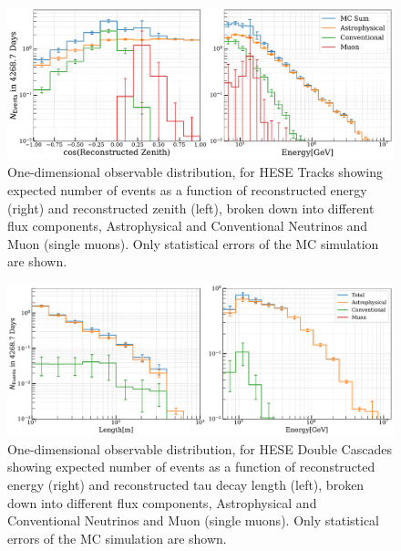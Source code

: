\begin{figure}[h!]
    \caption{One-dimensional observable distribution, for HESE Tracks showing expected number of events as a function of reconstructed energy (right) and reconstructed zenith (left), broken down into different flux components, Astrophysical and Conventional Neutrinos and Muon (single muons). Only statistical errors of the MC simulation are shown.}
    \includegraphics{./figures/Analysis/Tracks.pdf}
\end{figure}

\begin{figure}[h!]
    \caption{One-dimensional observable distribution, for HESE Double Cascades showing expected number of events as a function of reconstructed energy (right) and reconstructed tau decay length (left), broken down into different flux components, Astrophysical and Conventional Neutrinos and Muon (single muons). Only statistical errors of the MC simulation are shown.}
    \includegraphics{./figures/Analysis/Double.pdf}
\end{figure}

